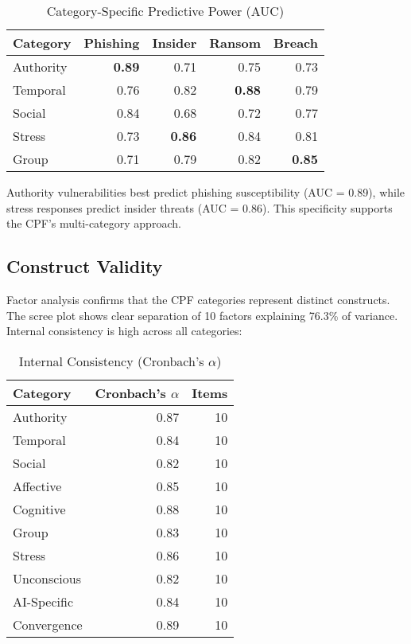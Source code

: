 \documentclass[10pt,twocolumn]{IEEEtran}
\begin{document}
\begin{table}[h]
\caption{Category-Specific Predictive Power (AUC)}
\label{tab:category}
\centering
\begin{tabular}{@{}lrrrr@{}}
\toprule
Category & Phishing & Insider & Ransom & Breach \\
\midrule
Authority & \textbf{0.89} & 0.71 & 0.75 & 0.73 \\
Temporal & 0.76 & 0.82 & \textbf{0.88} & 0.79 \\
Social & 0.84 & 0.68 & 0.72 & 0.77 \\
Stress & 0.73 & \textbf{0.86} & 0.84 & 0.81 \\
Group & 0.71 & 0.79 & 0.82 & \textbf{0.85} \\
\bottomrule
\end{tabular}
\end{table}

Authority vulnerabilities best predict phishing susceptibility (AUC = 0.89), while stress responses predict insider threats (AUC = 0.86). This specificity supports the CPF's multi-category approach.

\subsection{Construct Validity}

Factor analysis confirms that the CPF categories represent distinct constructs. The scree plot shows clear separation of 10 factors explaining 76.3\% of variance. Internal consistency is high across all categories:

\begin{table}[h]
\caption{Internal Consistency (Cronbach's $\alpha$)}
\label{tab:consistency}
\centering
\begin{tabular}{@{}lrr@{}}
\toprule
Category & Cronbach's $\alpha$ & Items \\
\midrule
Authority & 0.87 & 10 \\
Temporal & 0.84 & 10 \\
Social & 0.82 & 10 \\
Affective & 0.85 & 10 \\
Cognitive & 0.88 & 10 \\
Group & 0.83 & 10 \\
Stress & 0.86 & 10 \\
Unconscious & 0.82 & 10 \\
AI-Specific & 0.84 & 10 \\
Convergence & 0.89 & 10 \\
\bottomrule
\end{tabular}
\end{table}
\end{document}
